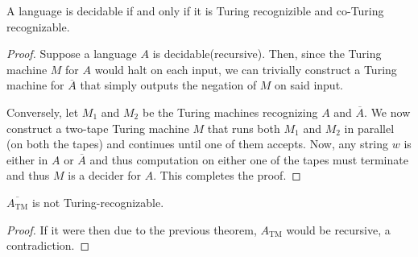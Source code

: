 \begin{theorem}
    A language is decidable if and only if it is Turing recognizible and co-Turing recognizable.
\end{theorem}
\begin{proof}
    Suppose a language $A$ is decidable(recursive). Then, since the Turing machine $M$ for $A$ would halt on each input, we can trivially construct a Turing machine for $\overline{A}$ that simply outputs the negation of $M$ on said input.

    Conversely, let $M_1$ and $M_2$ be the Turing machines recognizing $A$ and $\overline{A}$. We now construct a two-tape Turing machine $M$ that runs both $M_1$ and $M_2$ in parallel (on both the tapes) and continues until one of them accepts. Now, any string $w$ is either in $A$ or $\overline{A}$ and thus computation on either one of the tapes must terminate and thus $M$ is a decider for $A$. This completes the proof.
\end{proof}
\begin{corollary}
    $\overline{A_\text{TM}}$ is not Turing-recognizable.
\end{corollary}
\begin{proof}
    If it were then due to the previous theorem, $A_\text{TM}$ would be recursive, a contradiction.
\end{proof}